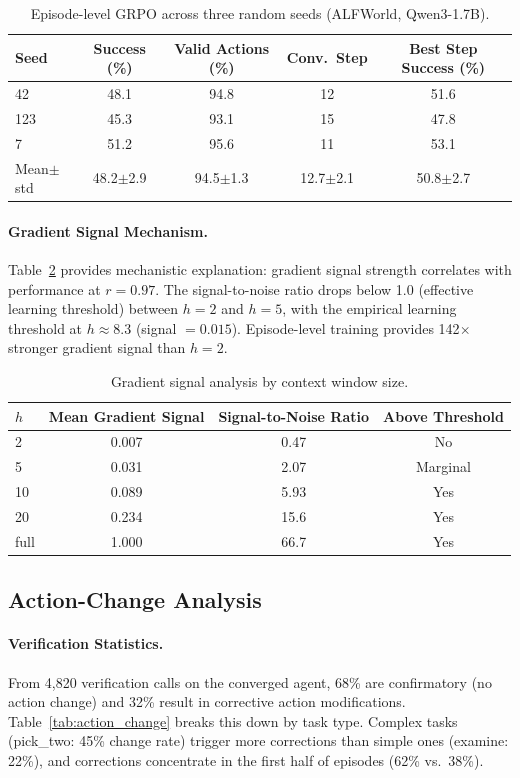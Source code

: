 \documentclass[11pt]{article}
\begin{document}
\begin{table}[h]
\centering
\caption{Episode-level GRPO across three random seeds (ALFWorld, Qwen3-1.7B).}
\label{tab:multi_seed}
\begin{tabular}{lcccc}
\toprule
Seed & Success (\%) & Valid Actions (\%) & Conv.\ Step & Best Step Success (\%) \\
\midrule
42 & 48.1 & 94.8 & 12 & 51.6 \\
123 & 45.3 & 93.1 & 15 & 47.8 \\
7 & 51.2 & 95.6 & 11 & 53.1 \\
\midrule
Mean$\pm$std & 48.2$\pm$2.9 & 94.5$\pm$1.3 & 12.7$\pm$2.1 & 50.8$\pm$2.7 \\
\bottomrule
\end{tabular}
\end{table}

\paragraph{Gradient Signal Mechanism.}
Table~\ref{tab:gradient} provides mechanistic explanation: gradient signal strength correlates with performance at $r = 0.97$. The signal-to-noise ratio drops below 1.0 (effective learning threshold) between $h = 2$ and $h = 5$, with the empirical learning threshold at $h \approx 8.3$ (signal $= 0.015$). Episode-level training provides 142$\times$ stronger gradient signal than $h = 2$.

\begin{table}[h]
\centering
\caption{Gradient signal analysis by context window size.}
\label{tab:gradient}
\begin{tabular}{lccc}
\toprule
$h$ & Mean Gradient Signal & Signal-to-Noise Ratio & Above Threshold \\
\midrule
2 & 0.007 & 0.47 & No \\
5 & 0.031 & 2.07 & Marginal \\
10 & 0.089 & 5.93 & Yes \\
20 & 0.234 & 15.6 & Yes \\
full & 1.000 & 66.7 & Yes \\
\bottomrule
\end{tabular}
\end{table}

\subsection{Action-Change Analysis}

\paragraph{Verification Statistics.}
From 4,820 verification calls on the converged agent, 68\% are confirmatory (no action change) and 32\% result in corrective action modifications. Table~\ref{tab:action_change} breaks this down by task type. Complex tasks (pick\_two: 45\% change rate) trigger more corrections than simple ones (examine: 22\%), and corrections concentrate in the first half of episodes (62\% vs.\ 38\%).
\end{document}
